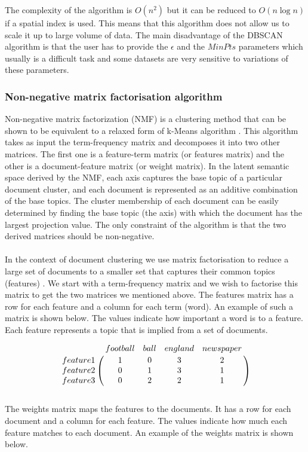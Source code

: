 The complexity of the algorithm is $O(n^2)$ but it can be reduced to $O(n\log n)$ if a spatial index is used. This means that this algorithm does not allow us to scale it up to large volume of data. The main disadvantage of the DBSCAN algorithm is that the user has to provide the $\epsilon $ and the $MinPts$ parameters which usually is a difficult task and some datasets are very sensitive to variations of these parameters. 

\subsubsection{Non-negative matrix factorisation algorithm}
Non-negative matrix factorization (NMF) is a clustering method that can be shown to be equivalent to a relaxed form of k-Means algorithm \citep{Ding05onthe}. This algorithm takes as input the term-frequency matrix and decomposes it into two other matrices. The first one is a feature-term matrix (or features matrix) and the other is a document-feature matrix (or weight matrix). In the latent semantic space derived by the NMF, each axis captures the base topic of a particular document cluster, and each document is represented as an additive combination of the base topics. The cluster membership of each document can be easily determined by finding the base topic (the axis) with which the document has the largest projection value. The only constraint of the algorithm is that the two derived matrices should be non-negative.\\\\ 
In the context of document clustering we use matrix factorisation to reduce a large set of documents to a smaller set that captures their common topics (features) \citep{Segaran:2007:PCI:1406354}. We start with a term-frequency matrix and we wish to factorise this matrix to get the two matrices we mentioned above. The features matrix has a row for each feature and a column for each term (word). An example of such a matrix is shown below. The values indicate how important a word is to a feature. Each feature represents a topic that is implied from a set of documents. 

\[
\bordermatrix{~ & football & ball & england & newspaper \cr
                  feature 1 & 1 & 0 & 3 & 2 \cr
                  feature 2 & 0 & 1 & 3 & 1\cr
                  feature 3 & 0 & 2 & 2 & 1\cr}
\]\\
The weights matrix maps the features to the documents. It has a row for each document and a column for each feature. The values indicate how much each feature matches to each document. An example of the weights matrix is shown below. 

